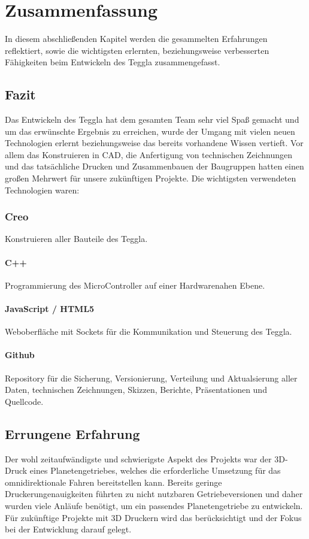 \chapter{Zusammenfassung}
In diesem abschließenden Kapitel werden die gesammelten Erfahrungen reflektiert, sowie die wichtigsten erlernten, beziehungsweise verbesserten Fähigkeiten beim Entwickeln des Teggla zusammengefasst.


\section{Fazit}
Das Entwickeln des Teggla hat dem gesamten Team sehr viel Spaß gemacht und um das erwünschte Ergebnis zu erreichen, wurde der Umgang mit vielen neuen Technologien erlernt beziehungsweise das bereits vorhandene Wissen vertieft. 
Vor allem das Konstruieren in CAD, die Anfertigung von technischen Zeichnungen und das tatsächliche Drucken und Zusammenbauen der Baugruppen hatten einen großen Mehrwert für unsere zukünftigen Projekte. 
Die wichtigsten verwendeten Technologien waren:

\subsection*{Creo}
Konstruieren aller Bauteile des Teggla.

\subsubsection*{C++}
Programmierung des MicroController auf einer Hardwarenahen Ebene.

\subsubsection*{JavaScript / HTML5}
Weboberfläche mit Sockets für die Kommunikation und Steuerung des Teggla.

\subsubsection*{Github}
Repository für die Sicherung, Versionierung, Verteilung und Aktualsierung aller Daten, technischen Zeichnungen, Skizzen, Berichte, Präsentationen und Quellcode.


\section{Errungene Erfahrung}
Der wohl zeitaufwändigste und schwierigste Aspekt des Projekts war der 3D-Druck eines Planetengetriebes, welches die erforderliche Umsetzung für das omnidirektionale Fahren bereitstellen kann. Bereits geringe Druckerungenauigkeiten führten zu nicht nutzbaren Getriebeversionen und daher wurden viele Anläufe benötigt, um ein passendes Planetengetriebe zu entwickeln. Für zukünftige Projekte mit 3D Druckern wird das berücksichtigt und der Fokus bei der Entwicklung darauf gelegt.  

